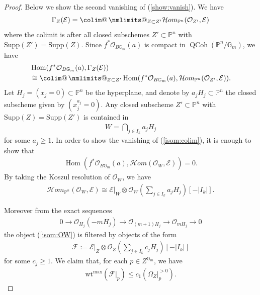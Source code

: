 \documentclass [11pt,oneside,a4paper,mathscr]{amsart}
\makeatletter
\theoremstyle{definition}
\renewcommand{\leq}{\leqslant}
\renewcommand{\geq}{\geqslant}
\newcommand{\QCoh}{\operatorname{QCoh}}
\newcommand{\bgm}{B\mathbb{G}_m}
\newcommand{\Hom}{\operatorname{Hom}}
\newcommand{\wt}{\mathrm{wt}}
\newcommand{\colim@}[2]{%
  \vtop{\m@th\ialign{##\cr
    \hfil$#1\operator@font colim$\hfil\cr
    \noalign{\nointerlineskip\kern1.5\ex@}#2\cr
    \noalign{\nointerlineskip\kern-\ex@}\cr}}%
}
\newcommand{\colim}{%
  \mathop{\mathpalette\colim@{}}\nmlimits@
}
\makeatother
\begin{document}
\begin{proof}
Below we show the second vanishing of (\ref{show:vanish}). 
We have 
\begin{align*}
    \Gamma_Z(\mathcal{E})=\colim_{Z \subset Z'} \mathcal{H}om_{\mathbb{P}^n}(\mathcal{O}_{Z'}, \mathcal{E})
\end{align*}
    where the colimit is after all closed 
    subschemes $Z'\subset \mathbb{P}^n$ with 
    $\mathrm{Supp}(Z')=\mathrm{Supp}(Z)$. 
Since $f^{\ast}\mathcal{O}_{\bgm}(a)$ is compact in 
$\QCoh(\mathbb{P}^n/\mathbb{G}_m)$, we have 
\begin{align}\label{isom:colim}
    &\Hom(f^{\ast}\mathcal{O}_{\bgm}(a), \Gamma_Z(\mathcal{E})) \\
  \notag  &\cong \colim_{Z\subset Z'} \Hom(f^{\ast}\mathcal{O}_{\bgm}(a), \mathcal{H}om_{\mathbb{P}^n}(\mathcal{O}_{Z'}, \mathcal{E})).
\end{align}
        Let $H_j=(x_j=0) \subset \mathbb{P}^n$ be the hyperplane, 
        and denote by $a_j H_j \subset \mathbb{P}^n$ the closed subscheme 
        given by $(x_j^{a_j}=0)$. 
    Any closed subscheme $Z'\subset \mathbb{P}^n$ with $\mathrm{Supp}(Z)=\mathrm{Supp}(Z')$ is contained in 
    \begin{align*}
        W=\bigcap_{j \in I_k}a_j H_j
    \end{align*}
    for some $a_j \geq 1$. In order to show the vanishing of (\ref{isom:colim}), it is enough to show 
    that 
    \begin{align*}
        \Hom(f^{\ast}\mathcal{O}_{\bgm}(a), \mathcal{H}om(\mathcal{O}_W, \mathcal{E}))=0.
    \end{align*}
    By taking the Koszul resolution of $\mathcal{O}_W$, 
    we have 
    \begin{align}\label{isom:OW}
        \mathcal{H}om_{\mathbb{P}^n}(\mathcal{O}_W, \mathcal{E})
        \cong \mathcal{E}|_{W} \otimes \mathcal{O}_W\left(\sum_{j\in I_k}a_j H_j \right)[-\lvert I_k\rvert].
    \end{align}
    
    Moreover from the exact sequences
    \begin{align*}
        0 \to \mathcal{O}_{H_j}(-mH_j) \to \mathcal{O}_{(m+1)H_j} \to \mathcal{O}_{mH_j} \to 0
    \end{align*}
    the object (\ref{isom:OW}) is filtered by objects 
    of the form 
    \begin{align*}
    \mathcal{F}:=
        \mathcal{E}|_{Z} \otimes \mathcal{O}_Z\left(\sum_{j\in I_k}c_j H_j \right)[-\lvert I_k\rvert]
    \end{align*}
    for some $c_j \geq 1$. 
    We claim that, for each $p\in Z^{\mathbb{G}_m}$, we
    have 
    \begin{align}\label{wt:p}
\wt^{\mathrm{max}}(\mathcal{F}|_{p}) \leq c_1(\Omega_Z|_{p}^{>0}). 
    \end{align}
    

\end{proof}
\end{document}

